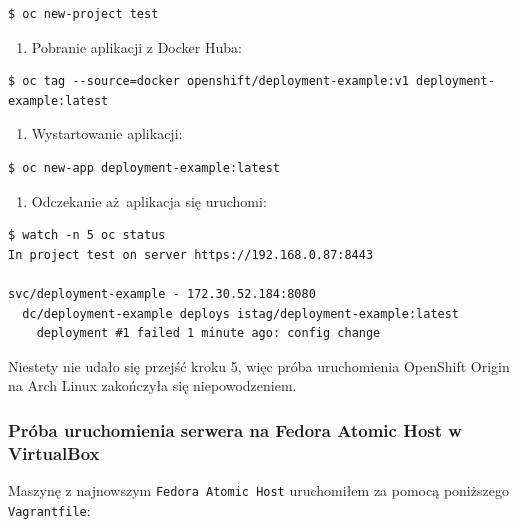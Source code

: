 \documentclass[a4paper,12pt,twoside,openany]{report}
\providecommand{\tightlist}{%
  \setlength{\itemsep}{0pt}\setlength{\parskip}{0pt}}
\newcommand{\passthrough}[1]{#1}
\begin{document}
\begin{lstlisting}
$ oc new-project test
\end{lstlisting}

\begin{enumerate}
\def\labelenumi{\arabic{enumi}.}
\setcounter{enumi}{3}
\tightlist
\item
  Pobranie aplikacji z Docker Huba:
\end{enumerate}

\begin{lstlisting}
$ oc tag --source=docker openshift/deployment-example:v1 deployment-example:latest
\end{lstlisting}

\begin{enumerate}
\def\labelenumi{\arabic{enumi}.}
\setcounter{enumi}{4}
\tightlist
\item
  Wystartowanie aplikacji:
\end{enumerate}

\begin{lstlisting}
$ oc new-app deployment-example:latest
\end{lstlisting}

\begin{enumerate}
\def\labelenumi{\arabic{enumi}.}
\setcounter{enumi}{5}
\tightlist
\item
  Odczekanie aż~aplikacja się uruchomi:
\end{enumerate}

\begin{lstlisting}
$ watch -n 5 oc status
In project test on server https://192.168.0.87:8443

svc/deployment-example - 172.30.52.184:8080
  dc/deployment-example deploys istag/deployment-example:latest 
    deployment #1 failed 1 minute ago: config change
\end{lstlisting}

Niestety nie udało się przejść kroku 5, więc próba uruchomienia
OpenShift Origin na Arch Linux zakończyła się niepowodzeniem.

\hypertarget{pruxf3ba-uruchomienia-serwera-na-fedora-atomic-host-w-virtualbox}{%
\subsubsection{Próba uruchomienia serwera na Fedora Atomic Host w
VirtualBox}\label{pruxf3ba-uruchomienia-serwera-na-fedora-atomic-host-w-virtualbox}}

Maszynę z najnowszym \passthrough{\lstinline!Fedora Atomic Host!}
uruchomiłem za pomocą poniższego \passthrough{\lstinline!Vagrantfile!}:
\end{document}
